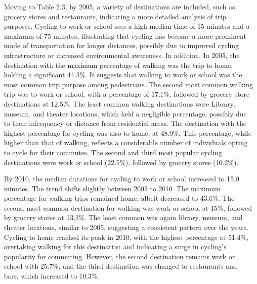 \documentclass[12pt,twoside]{reedthesis}
\begin{document}
Moving to Table 2.3, by 2005, a variety of destinations are included, such as grocery stores and restaurants, indicating a more detailed analysis of trip purposes. Cycling to work or school sees a high median time of 15 minutes and a maximum of 75 minutes, illustrating that cycling has become a more prominent mode of transportation for longer distances, possibly due to improved cycling infrastructure or increased environmental awareness. In addition, In 2005, the destination with the maximum percentage of walking was the trip to home, holding a significant 44.3\%. It suggests that walking to work or school was the most common trip purpose among pedestrians. The second most common walking trip was to work or school, with a percentage of 17.1\%, followed by grocery store destinations at 12.5\%. The least common walking destinations were Library, museum, and theater locations, which held a negligible percentage, possibly due to their infrequency or distance from residential areas. The destination with the highest percentage for cycling was also to home, at 48.9\%. This percentage, while higher than that of walking, reflects a considerable number of individuals opting to cycle for their commutes. The second and third most popular cycling destinations were work or school (22.5\%), followed by grocery stores (10.2\%).

By 2010, the median durations for cycling to work or school increased to 15.0 minutes. The trend shifts slightly between 2005 to 2010. The maximum percentage for walking trips remained home, albeit decreased to 43.6\%. The second most common destination for walking was work or school at 15\%, followed by grocery stores at 13.3\%. The least common was again library, museum, and theater locations, similar to 2005, suggesting a consistent pattern over the years.
Cycling to home reached its peak in 2010, with the highest percentage at 51.4\%, overtaking walking for this destination and indicating a surge in cycling's popularity for commuting. However, the second destination remains work or school with 25.7\%, and the third destination was changed to restaurants and bars, which increased to 10.3\%.
\end{document}
